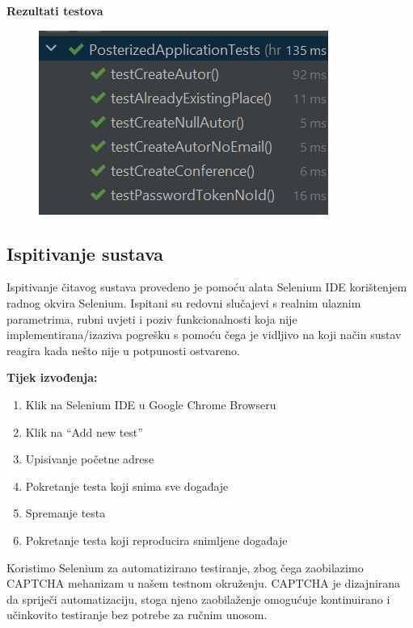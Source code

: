 			\textbf{Rezultati testova} 
			\begin{figure}[H]
				\includegraphics[scale=0.30]{slike/deploy/backTestResults.png}
				\centering
				\label{fig:promjene6}
			\end{figure}
			
			
			
			\subsection{Ispitivanje sustava}
			
		Ispitivanje čitavog sustava provedeno je pomoću alata Selenium IDE korištenjem radnog okvira Selenium. Ispitani su redovni slučajevi s realnim ulaznim parametrima, rubni uvjeti i poziv funkcionalnosti koja nije implementirana/izaziva pogrešku s pomoću čega je vidljivo na koji način sustav reagira kada nešto nije u potpunosti ostvareno.
			
			\textbf{Tijek izvođenja:}
			\begin{enumerate}
				\item Klik na Selenium IDE u Google Chrome Browseru
				\item Klik na “Add new test”
				\item Upisivanje početne adrese
				\item Pokretanje testa koji snima sve događaje
				\item Spremanje testa
				\item Pokretanje testa koji reproducira snimljene događaje
			\end{enumerate}
			
			Koristimo Selenium za automatizirano testiranje, zbog čega zaobilazimo CAPTCHA mehanizam u našem testnom okruženju. CAPTCHA je dizajnirana da spriječi automatizaciju, stoga njeno zaobilaženje omogućuje kontinuirano i učinkovito testiranje bez potrebe za ručnim unosom.
			
